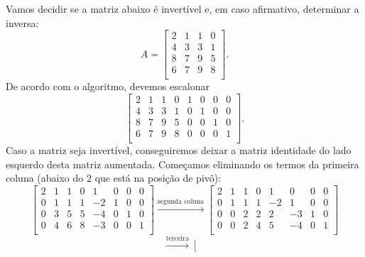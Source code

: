 \documentclass[../livro.tex]{subfiles}  %
\begin{document}
\begin{example}
	Vamos decidir se a matriz abaixo é invertível e, em caso afirmativo, determinar a inversa:
	\begin{equation}
	A =
	\left[
	\begin{array}{cccc}
	2 & 1 & 1 & 0 \\
	4 & 3 & 3 & 1 \\
	8 & 7 & 9 & 5 \\
	6 & 7 & 9 & 8 \\
	\end{array}
	\right].
	\end{equation} De acordo com o algoritmo, devemos escalonar
	\begin{equation}
	\left[
	\begin{array}{cccc|cccc}
	2 & 1 & 1 & 0 & 1 & 0 & 0 & 0 \\
	4 & 3 & 3 & 1 & 0 & 1 & 0 & 0 \\
	8 & 7 & 9 & 5 & 0 & 0 & 1 & 0 \\
	6 & 7 & 9 & 8 & 0 & 0 & 0 & 1 \\
	\end{array}
	\right].
	\end{equation} Caso a matriz seja invertível, conseguiremos deixar a matriz identidade do lado esquerdo desta matriz aumentada. Começamos eliminando os termos da primeira coluna (abaixo do $2$ que está na posição de pivô):
	\begin{equation}
	\left[
	\begin{array}{cccc|cccc}
	2 & 1 & 1 & 0 & 1 & 0 & 0 & 0 \\
	0 & 1 & 1 & 1 & -2 & 1 & 0 & 0 \\
	0 & 3 & 5 & 5 & -4 & 0 & 1 & 0 \\
	0 & 4 & 6 & 8 & -3 & 0 & 0 & 1 \\
	\end{array}
	\right] \xrightarrow{\text{segunda coluna}}
	\left[
	\begin{array}{cccc|cccc}
	2 & 1 & 1 & 0 & 1 & 0 & 0 & 0 \\
	0 & 1 & 1 & 1 & -2 & 1 & 0 & 0 \\
	0 & 0 & 2 & 2 & 2 & -3 & 1 & 0 \\
	0 & 0 & 2 & 4 & 5 & -4 & 0 & 1 \\
	\end{array}
	\right]
	\end{equation}
	\begin{equation}
	\xrightarrow{\text{terceira}}
	\left[
	\begin{array}{cccc|cccc}

\end{array}
\end{equation}
\end{example}
\end{document}
